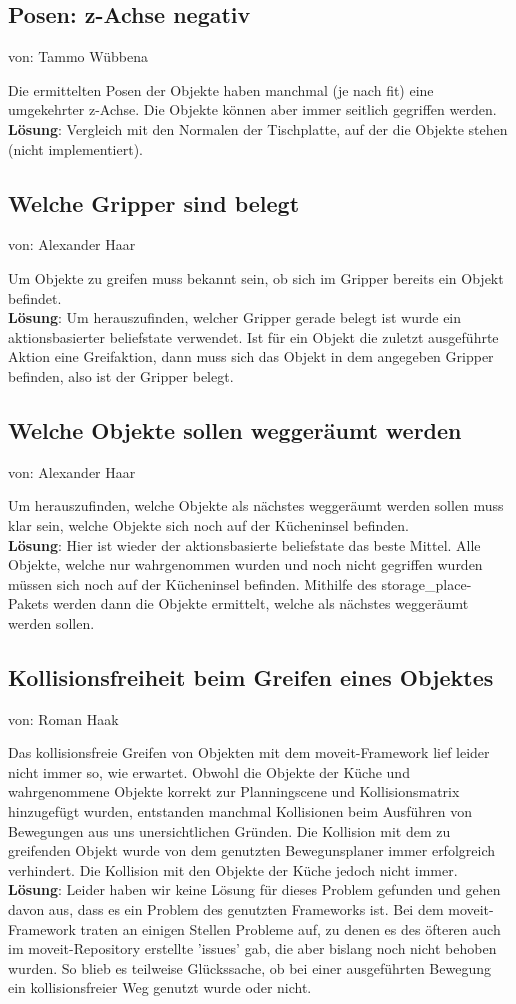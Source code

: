 \documentclass{suturo}
\makeatletter
\newcommand{\chapterauthor}[1]{%
  {\parindent0pt\vspace*{-27pt}%
  \linespread{0}\small\begin{flushright}von: #1\end{flushright}%
  \par\nobreak\vspace*{0pt}}
  \@afterheading%
}
\makeatother
\begin{document}
\subsection{Posen: z-Achse negativ}
\chapterauthor{Tammo Wübbena}
Die ermittelten Posen der Objekte haben manchmal (je nach fit) eine umgekehrter z-Achse. Die Objekte können aber immer seitlich gegriffen werden.
\textbf{Lösung}: Vergleich mit den Normalen der Tischplatte, auf der die Objekte stehen (nicht implementiert).

\subsection{Welche Gripper sind belegt}
\chapterauthor{Alexander Haar}
Um Objekte zu greifen muss bekannt sein, ob sich im Gripper bereits ein Objekt befindet.\\
\textbf{Lösung}: Um herauszufinden, welcher Gripper gerade belegt ist wurde ein aktionsbasierter beliefstate verwendet. Ist für ein Objekt die zuletzt ausgeführte Aktion eine Greifaktion, dann muss sich das Objekt in dem angegeben Gripper befinden, also ist der Gripper belegt.

\subsection{Welche Objekte sollen weggeräumt werden}
\chapterauthor{Alexander Haar} 
Um herauszufinden, welche Objekte als nächstes weggeräumt werden sollen muss klar sein, welche Objekte sich noch auf der Kücheninsel befinden.\\
\textbf{Lösung}: Hier ist wieder der aktionsbasierte beliefstate das beste Mittel. Alle Objekte, welche nur wahrgenommen wurden und noch nicht gegriffen wurden müssen sich noch auf der Kücheninsel befinden. Mithilfe des storage\_place- Pakets werden dann die Objekte ermittelt, welche als nächstes weggeräumt werden sollen.

\subsection{Kollisionsfreiheit beim Greifen eines Objektes}
\chapterauthor{Roman Haak}
Das kollisionsfreie Greifen von Objekten mit dem moveit-Framework lief leider nicht immer so, wie erwartet. Obwohl die Objekte der Küche und wahrgenommene Objekte korrekt zur Planningscene und Kollisionsmatrix hinzugefügt wurden, entstanden manchmal Kollisionen beim Ausführen von Bewegungen aus uns unersichtlichen Gründen. Die Kollision mit dem zu greifenden Objekt wurde von dem genutzten Bewegunsplaner immer erfolgreich verhindert. Die Kollision mit den Objekte der Küche jedoch nicht immer.\\
\textbf{Lösung}: Leider haben wir keine Lösung für dieses Problem gefunden und gehen davon aus, dass es ein Problem des genutzten Frameworks ist. Bei dem moveit-Framework traten an einigen Stellen Probleme auf, zu denen es des öfteren auch im moveit-Repository erstellte 'issues' gab, die aber bislang noch nicht behoben wurden. So blieb es teilweise Glückssache, ob bei einer ausgeführten Bewegung ein kollisionsfreier Weg genutzt wurde oder nicht.
\end{document}
